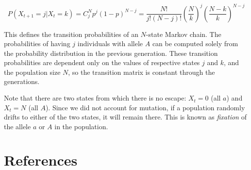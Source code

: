 \documentclass[
  letterpaper,
  DIV=11,
  numbers=noendperiod]{scrreprt}
\newlength{\cslhangindent}
\newenvironment{CSLReferences}[2] %
 {\begin{list}{}{%
  \setlength{\itemindent}{0pt}
  \setlength{\leftmargin}{0pt}
  \setlength{\parsep}{0pt}
  \ifodd #1
   \setlength{\leftmargin}{\cslhangindent}
   \setlength{\itemindent}{-1\cslhangindent}
  \fi
  \setlength{\itemsep}{#2\baselineskip}}}
 {\end{list}}
\begin{document}
\[
P(X_{t+1} = j | X_t = k) = C^N_j p^j (1-p)^{N-j} = \frac{N!}{j! (N-j)!} \left(\frac{N}{k}\right)^j \left(\frac{N-k}{k}\right)^{N-j}
\]

This defines the transition probabilities of an \(N\)-state Markov
chain. The probabilities of having \(j\) individuals with allele \(A\)
can be computed solely from the probability distribution in the previous
generation. These transition probabilities are dependent only on the
values of respective states \(j\) and \(k\), and the population size
\(N\), so the transition matrix is constant through the generations.

Note that there are two states from which there is no escape:
\(X_t = 0\) (all \(a\)) and \(X_t = N\) (all \(A\)). Since we did not
account for mutation, if a population randomly drifts to either of the
two states, it will remain there. This is known as \emph{fixation} of
the allele \(a\) or \(A\) in the population.


\chapter*{References}\label{references}


\label{refs}
\begin{CSLReferences}{0}{1}
\end{CSLReferences}
\end{document}
